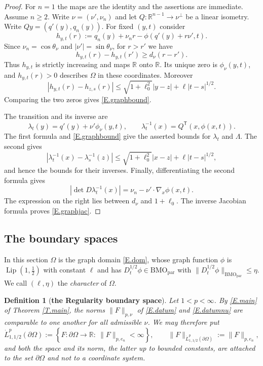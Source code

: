 \documentclass[12pt,leqno]{amsart}
\numberwithin{equation}{section}
\DeclareMathOperator{\Lip}{Lip}
\newcommand{\R}{\mathbb R}
\newcommand{\set}[1]{\left\{#1\right\}}
\newcommand{\om}{\Omega}
\newcommand{\pom}{\partial\Omega}
\newcommand{\dhalf}{D_t^{1/2}}
\newcommand{\BMOpar}{\mathrm{BMO}_{\mathrm{par}}}
\theoremstyle{plain}
\newtheorem{definition}[equation]{Definition}
\theoremstyle{remark}
\begin{document}
\begin{proof}
For $n=1$ the maps are the identity and the assertions are immediate.
Assume $n\ge2$. Write $\nu=(\nu',\nu_n)$ and let
$Q:\R^{n-1}\to\nu^\perp$ be a linear isometry. Write
$Qy=(q'(y),q_n(y))$. For fixed $(y,t)$ consider
$$h_{y,t}(r):=q_n(y)+\nu_n r-\phi(q'(y)+r\nu',t).$$
Since $\nu_n=\cos\theta_\nu$ and $|\nu'|=\sin\theta_\nu$, for $r>r'$ we have
$$h_{y,t}(r)-h_{y,t}(r')\ge d_\nu(r-r').$$
Thus $h_{y,t}$ is strictly increasing and maps $\R$ onto $\R$. Its unique
zero is $\phi_\nu(y,t)$, and $h_{y,t}(r)>0$ describes $\om$ in these
coordinates. Moreover
\[
 |h_{y,t}(r)-h_{z,s}(r)|
 \le \sqrt{1+\ell_0^2}|y-z|+\ell|t-s|^{1/2}.
\]
Comparing the two zeros gives \eqref{E.graphbound}.\medskip

\noindent The transition and its inverse are
\[
 \lambda_t(y)=q'(y)+\nu'\phi_\nu(y,t),\qquad
 \lambda_t^{-1}(x)=Q^{\mathsf T}(x,\phi(x,t)).
\]
The first formula and \eqref{E.graphbound} give the asserted bounds for
$\lambda_t$ and $\Lambda$. The second gives
\[
 |\lambda_t^{-1}(x)-\lambda_s^{-1}(z)|
 \le \sqrt{1+\ell_0^2}|x-z|+\ell|t-s|^{1/2},
\]
and hence the bounds for their inverses. Finally, differentiating the
second formula gives
$$|\det D\lambda_t^{-1}(x)|
   =\nu_n-\nu'\cdot\nabla_x\phi(x,t).$$
The expression on the right lies between $d_\nu$ and $1+\ell_0$.
The inverse Jacobian formula proves \eqref{E.graphjac}.
\end{proof}

\subsection{The boundary spaces}\label{ss.bdyspaces}

In this section $\om$ is the graph domain \eqref{E.dom}, whose graph function
$\phi$ is $\Lip(1,\tfrac12)$ with constant $\ell$ and has
$\dhalf\phi\in\BMOpar$ with $\|\dhalf\phi\|_{\BMOpar}\le\eta$. We call
$(\ell,\eta)$ the \emph{character} of $\om$.

\begin{definition}[\bf the Regularity boundary space]\label{D.bdyspace}
Let $1<p<\infty$. By \eqref{E.main} of Theorem \ref{T.main}, the norms
$\|F\|_{p,\nu}$ of \eqref{E.datum} and \eqref{E.datumnu} are comparable to
one another for all admissible $\nu$. We may
therefore put
\begin{equation}\label{E.bdyspace}
  \dot L^p_{1,1/2}(\pom):=\set{F:\pom\to\R:\ \|F\|_{p,e_n}<\infty},\qquad
  \|F\|_{\dot L^p_{1,1/2}(\pom)}:=\|F\|_{p,e_n} ,
\end{equation}
and both the space and its norm, the latter up to bounded constants, are
attached to the set $\pom$ and not to a coordinate system.
\end{definition}
\end{document}
